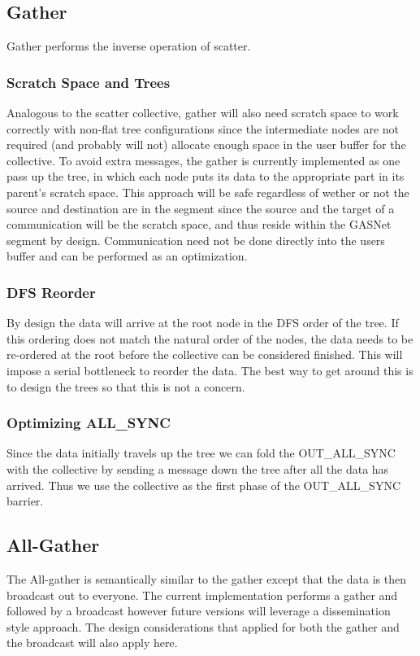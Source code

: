 \documentclass[times,10pt]{article}
\begin{document}
\subsection{Gather}
Gather performs the inverse operation of scatter. 

\subsubsection{Scratch Space and Trees}
Analogous to the scatter collective, gather will also need scratch space to work correctly with non-flat tree configurations since the intermediate nodes are not required (and probably will not) allocate enough space in the user buffer for the collective. To avoid extra messages, the gather is currently implemented as one pass up the tree, in which each node puts its data to the appropriate part in its parent's scratch space. This approach will be safe regardless of wether or not the source and destination are in the segment since the source and the target of a communication will be the scratch space, and thus reside within the GASNet segment by design. Communication need not be done directly into the users buffer and can be performed as an optimization. 

\subsubsection{DFS Reorder}
By design the data will arrive at the root node in the DFS order of the tree. If this ordering does not match the natural order of the nodes, the data needs to be re-ordered at the root before the collective can be considered finished. This will impose a serial bottleneck to reorder the data. The best way to get around this is to design the trees so that this is not a concern. 

\subsubsection{Optimizing ALL\_SYNC}
Since the data initially travels up the tree we can fold the OUT\_ALL\_SYNC with the collective by sending a message down the tree after all the data has arrived. Thus we use the collective as the first phase of the OUT\_ALL\_SYNC barrier. 

\subsection{All-Gather}
The All-gather is semantically similar to the gather except that the data is then broadcast out to everyone. The current implementation performs a gather and followed by a broadcast however future versions will leverage a dissemination style approach. The design considerations that applied for both the gather and the broadcast will also apply here. 
\end{document}
